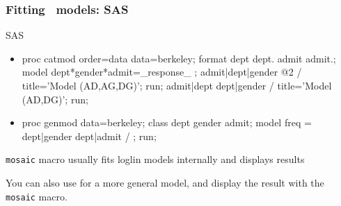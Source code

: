 \renewcommand{\FileName}{loglfit}
\begin{frame}[fragile]
 \frametitle{Fitting \loglin\ models: SAS}
 \begin{block}{SAS}
  \begin{itemize}
   \item {}
\begin{Input}[baselinestretch=0.8,fontsize=\footnotesize]
proc catmod order=data data=berkeley;
   format dept dept. admit admit.;
                     
   model dept*gender*admit=_response_ ;
    admit|dept|gender @2   / title='Model (AD,AG,DG)'; run;
    admit|dept dept|gender / title='Model (AD,DG)';  run;
\end{Input}

   \item {}
\begin{Input}[baselinestretch=0.8,fontsize=\footnotesize]
proc genmod data=berkeley;
   class dept gender admit;
   model freq = dept|gender dept|admit / ;
run;
\end{Input}

  \end{itemize}
 \end{block}
\begin{itemize*}
  \item \texttt{mosaic} macro usually fits loglin models internally and
  displays results
  \item You can also use  for a more general model, and
  display the result with the \texttt{mosaic} macro.
\end{itemize*}
  
\end{frame}

